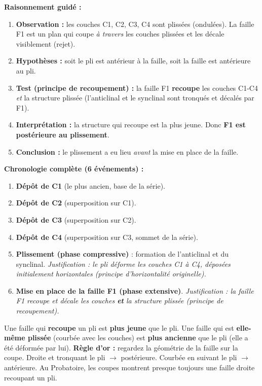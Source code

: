 \documentclass[11pt]{article}
\begin{document}
\begin{experience}
\textbf{Raisonnement guidé :}
\begin{enumerate}
    \item \textbf{Observation :} les couches C1, C2, C3, C4 sont plissées (ondulées). La faille F1 est un plan qui coupe \emph{à travers} les couches plissées et les décale visiblement (rejet).
    \item \textbf{Hypothèses :} soit le pli est antérieur à la faille, soit la faille est antérieure au pli.
    \item \textbf{Test (principe de recoupement) :} la faille F1 \textbf{recoupe} les couches C1-C4 \emph{et} la structure plissée (l'anticlinal et le synclinal sont tronqués et décalés par F1).
    \item \textbf{Interprétation :} la structure qui recoupe est la plus jeune. Donc \textbf{F1 est postérieure au plissement}.
    \item \textbf{Conclusion :} le plissement a eu lieu \emph{avant} la mise en place de la faille.
\end{enumerate}

\textbf{Chronologie complète (6 événements) :}
\begin{enumerate}
    \item \textbf{Dépôt de C1} (le plus ancien, base de la série).
    \item \textbf{Dépôt de C2} (superposition sur C1).
    \item \textbf{Dépôt de C3} (superposition sur C2).
    \item \textbf{Dépôt de C4} (superposition sur C3, sommet de la série).
    \item \textbf{Plissement (phase compressive)} : formation de l'anticlinal et du synclinal. \textit{Justification : le pli déforme les couches C1 à C4, déposées initialement horizontales (principe d'horizontalité originelle).}
    \item \textbf{Mise en place de la faille F1 (phase extensive)}. \textit{Justification : la faille F1 recoupe et décale les couches \textbf{et} la structure plissée (principe de recoupement).}
\end{enumerate}
\end{experience}

\begin{attention}
Une faille qui \textbf{recoupe} un pli est \textbf{plus jeune} que le pli.
Une faille qui est \textbf{elle-même plissée} (courbée avec les couches) est \textbf{plus ancienne} que le pli (elle a été déformée par lui).
\textbf{Règle d'or :} regardez la géométrie de la faille sur la coupe. Droite et tronquant le pli $\rightarrow$ postérieure. Courbée en suivant le pli $\rightarrow$ antérieure. Au Probatoire, les coupes montrent presque toujours une faille droite recoupant un pli.
\end{attention}
\end{document}
